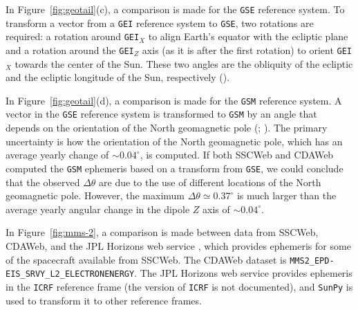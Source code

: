 \documentclass[draft]{agujournal2019}
\begin{document}
In Figure~\ref{fig:geotail}(c), a comparison is made for the \texttt{GSE} reference system. To transform a vector from a \texttt{GEI} reference system to \texttt{GSE}, two rotations are required: a rotation around \texttt{GEI}$_X$ to align Earth's equator with the ecliptic plane and a rotation around the \texttt{GEI}$_Z$ axis (as it is after the first rotation) to orient \texttt{GEI}$_X$ towards the center of the Sun. These two angles are the obliquity of the ecliptic and the ecliptic longitude of the Sun, respectively ().

In Figure~\ref{fig:geotail}(d), a comparison is made for the \texttt{GSM} reference system. A vector in the \texttt{GSE} reference system is transformed to \texttt{GSM} by an angle that depends on the orientation of the North geomagnetic pole (; ). The primary uncertainty is how the orientation of the North geomagnetic pole, which has an average yearly change of ${\sim}0.04^\circ$, is computed. If both SSCWeb and CDAWeb computed the \texttt{GSM} ephemeris based on a transform from \texttt{GSE}, we could conclude that the observed $\Delta \theta$ are due to the use of different locations of the North geomagnetic pole. However, the maximum $\Delta \theta \simeq 0.37^\circ$ is much larger than the average yearly angular change in the dipole $Z$ axis of ${\sim}0.04^\circ$.




In Figure~\ref{fig:mms-2}, a comparison is made between data from SSCWeb, CDAWeb, and the JPL Horizons web service \cite{JPLHorizons}, which provides ephemeris for some of the spacecraft available from SSCWeb. The CDAWeb dataset is  \texttt{MMS2\_EPD-EIS\_SRVY\_L2\_ELECTRONENERGY}. The JPL Horizons web service provides ephemeris in the \texttt{ICRF} reference frame (the version of \texttt{ICRF} is not documented), and \texttt{SunPy} is used to transform it to other reference frames.
\end{document}
